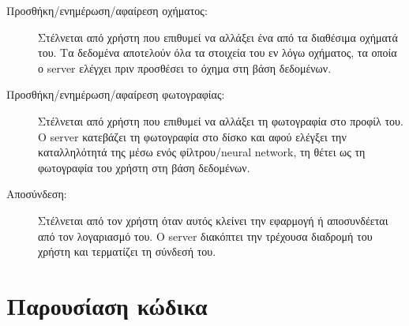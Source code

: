 \documentclass[../thesis.tex]{subfiles}
\begin{document}
\begin{description}
    \item[Προσθήκη/ενημέρωση/αφαίρεση οχήματος:] Στέλνεται από χρήστη που επιθυμεί να αλλάξει ένα από τα διαθέσιμα οχήματά του. Τα δεδομένα αποτελούν όλα τα στοιχεία του εν λόγω οχήματος, τα οποία ο server ελέγχει πριν προσθέσει το όχημα στη βάση δεδομένων.
    \item[Προσθήκη/ενημέρωση/αφαίρεση φωτογραφίας:] Στέλνεται από χρήστη που επιθυμεί να αλλάξει τη φωτογραφία στο προφίλ του. Ο server κατεβάζει τη φωτογραφία στο δίσκο και αφού ελέγξει την καταλληλότητά της μέσω ενός φίλτρου/neural network, τη θέτει ως τη φωτογραφία του χρήστη στη βάση δεδομένων.
    \item[Αποσύνδεση:] Στέλνεται από τον χρήστη όταν αυτός κλείνει την εφαρμογή ή αποσυνδέεται από τον λογαριασμό του. Ο server διακόπτει την τρέχουσα διαδρομή του χρήστη και τερματίζει τη σύνδεσή του.
\end{description}

\section{Παρουσίαση κώδικα}

\end{document}
